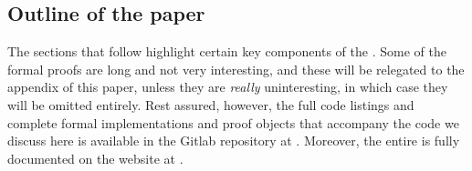 \documentclass[a4paper,UKenglish,cleveref, autoref, thm-restate]{lipics-v2019}
\begin{document}




\subsection{Outline of the paper}
The sections that follow highlight certain key components of the \agdaualib. Some of the formal proofs are long and not very interesting, and these will be relegated to the appendix of this paper, unless they are \emph{really} uninteresting, in which case they will be omitted entirely.  Rest assured, however, the full code listings and complete formal implementations and proof objects that accompany the code we discuss here is available in the \agdaualib Gitlab repository at \ualibgitlabio.  Moreover, the entire \agdaualib is fully documented on the website at \agdaualibdoc.
\end{document}
